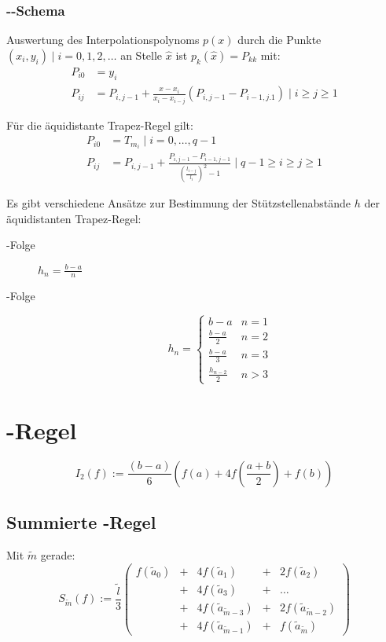\subsubsection{\protect{}-\protect{}-Schema}

Auswertung des Interpolationspolynoms $p(x)$ durch die Punkte $(x_{i},y_{i})\mid i=0,1,2,\ldots$ an Stelle $\hat{x}$ ist $p_{k}(\hat{x})=P_{kk}$ mit:
\begin{align*}
  P_{i0} & =y_{i}\\
  P_{ij} & =P_{i,j-1}+\frac{\hat{x}-x_{i}}{x_{i}-x_{i-j}}\left(P_{i,j-1}-P_{i-1,j.1}\right)\mid i\geq j\geq1
\end{align*}


Für die äquidistante Trapez-Regel gilt:
\begin{align*}
  P_{i0} & =T_{m_{i}}\mid i=0,\ldots,q-1\\
  P_{ij} & =P_{i,j-1}+\frac{P_{i,j-1}-P_{i-1,j-1}}{\left(\frac{l_{i-j}}{l_{i}}\right)^{2}-1}\mid q-1\geq i\geq j\geq1
\end{align*}


Es gibt verschiedene Ansätze zur Bestimmung der Stützstellenabstände $h$ der äquidistanten Trapez-Regel:
\begin{description}
  \item [{-Folge}]
	$h_{n}=\frac{b-a}{n}$
  \item [{-Folge}]
	\[ h_n = \begin{cases}
	    b-a               & n=1\\
	    \frac{b-a}{2}     & n=2\\
	    \frac{b-a}{3}     & n=3\\
	    \frac{h_{n-2}}{2} & n>3
	  \end{cases}
	\]
\end{description}

\section{\protect{}-Regel}

\[ I_{2}(f):=\frac{(b-a)}{6}\left(f(a)+4f\left(\frac{a+b}{2}\right)+f(b)\right) \]



\subsection{Summierte \protect{}-Regel}

Mit $\tilde{m}$ gerade:
\[
  S_{\tilde{m}}(f) := \frac{\tilde{l}}{3}
    \begin{pmatrix}
      f(\tilde{a}_{0}) & + & 4f(\tilde{a}_{1})           & + & 2f(\tilde{a}_{2})\\
                       & + & 4f(\tilde{a}_{3})           & + & \ldots\\
                       & + & 4f(\tilde{a}_{\tilde{m}-3}) & + & 2f(\tilde{a}_{\tilde{m}-2})\\
                       & + & 4f(\tilde{a}_{\tilde{m}-1}) & + & f(\tilde{a}_{\tilde{m}})
    \end{pmatrix}
\]



